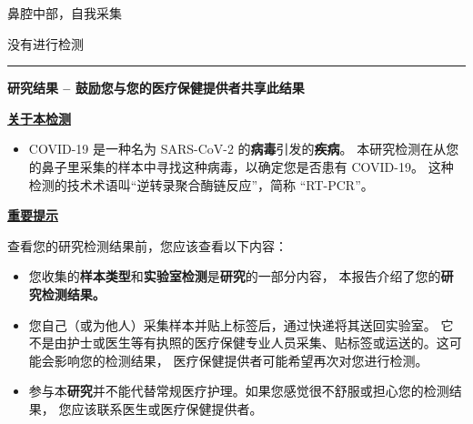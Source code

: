 \documentclass[10pt]{article}
\newcommand{\PageLine}{\rule{\textwidth}{0.25mm}}
\begin{document}
\begin{description}[font=\normalfont,align=left,labelwidth=6em]
\item [\textbf{\VAR{pat_name|e}}]
\item [\textbf{出生日期：}] 
\item [\textbf{标本：}] 鼻腔中部，自我采集
\item [\textbf{采集条形码：}] 
\item [\textbf{采集日期：}] 
\item [\textbf{报告日期：}]
  没有进行检测
\end{description}

\PageLine

\begin{center}
\Large
\textbf{研究结果 – 鼓励您与您的医疗保健提供者共享此结果}
\end{center}

\bigskip

\large \underline{\textbf{关于本检测}}

\begin{itemize}
\item

  COVID-19 是一种名为 SARS-CoV-2 的\textbf{病毒}引发的\textbf{疾病}。
  本研究检测在从您的鼻子里采集的样本中寻找这种病毒，以确定您是否患有 COVID-19。
  这种检测的技术术语叫``逆转录聚合酶链反应''，简称 ``RT-PCR''。

\end{itemize}

\bigskip

\large \underline{\textbf{重要提示}}

查看您的研究检测结果前，您应该查看以下内容：

\begin{itemize}
\item

  您收集的\textbf{样本类型}和\textbf{实验室检测}是\textbf{研究}的一部分内容，
  本报告介绍了您的\textbf{研究检测结果。}

\item

  您自己（或为他人）采集样本并贴上标签后，通过快递将其送回实验室。
  它不是由护士或医生等有执照的医疗保健专业人员采集、贴标签或运送的。这可能会影响您的检测结果，
  医疗保健提供者可能希望再次对您进行检测。

\item

  参与本\textbf{研究}并不能代替常规医疗护理。如果您感觉很不舒服或担心您的检测结果，
  您应该联系医生或医疗保健提供者。

\end{itemize}
\end{document}
